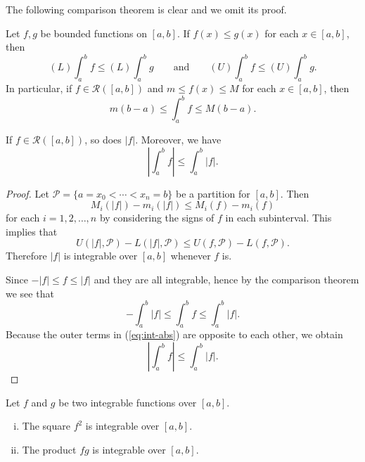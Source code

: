 The following comparison theorem is clear and we omit its proof.
\begin{thm}
  Let $f, g$ be bounded functions on $[a,b]$.  If $f(x) \leqslant g(x)$ for each $x \in [a,b]$, then
  \[
    (L) \int_a^b f \leqslant (L) \int_a^b g \qquad \text{and} \qquad
    (U) \int_a^b f \leqslant (U) \int_a^b g.
  \]
  In particular, if $f \in \mathcal{R}([a,b])$ and $m \leqslant f(x) \leqslant M$ for each $x \in [a,b]$, then
  \[
    m(b-a) \leqslant \int_a^b f \leqslant M(b-a).
  \]
\end{thm}

\begin{thm}
  \label{thm:abs-integrable}
  If $f \in \mathcal{R}([a,b])$, so does $|f|$.
  Moreover, we have
  \[
    \left| \int_a^b f \right| \leqslant \int_a^b |f|.
  \]
\end{thm}

\begin{proof}
  Let $\mathcal{P} = \{ a = x_0 < \cdots < x_n = b \}$ be a partition for $[a,b]$.  Then
  \[
    M_i(|f|) - m_i(|f|) \leqslant M_i(f) - m_i(f)
  \]
  for each $i = 1, 2, \dots, n$ by considering the signs of $f$ in each subinterval.  This implies that
  \[
    U(|f|,\mathcal{P}) - L(|f|,\mathcal{P}) \leqslant U(f,\mathcal{P}) - L(f,\mathcal{P}).
  \]
  Therefore $|f|$ is integrable over $[a,b]$ whenever $f$ is.

  Since $-|f| \leqslant f \leqslant |f|$ and they are all integrable, hence by the comparison theorem we see that
  \begin{equation}
    \label{eq:int-abs}
    - \int_a^b |f| \leqslant \int_a^b f \leqslant \int_a^b |f|.
  \end{equation}
  Because the outer terms in (\ref{eq:int-abs}) are opposite to each other, we obtain
  \[
    \left| \int_a^b f \right| \leqslant \int_a^b |f|.
  \]
\end{proof}

\begin{thm}
  Let $f$ and $g$ be two integrable functions over $[a,b]$.
  \begin{enumerate}[(i)]
    \item The square $f^2$ is integrable over $[a,b]$.

    \item The product $fg$ is integrable over $[a,b]$.
  \end{enumerate}
\end{thm}

